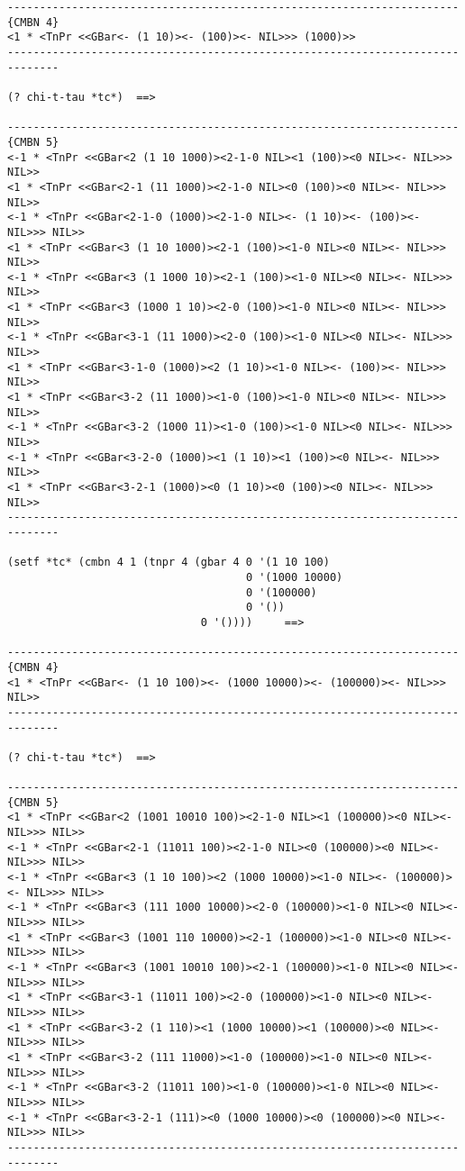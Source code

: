 {\footnotesize\begin{verbatim}
----------------------------------------------------------------------{CMBN 4}
<1 * <TnPr <<GBar<- (1 10)><- (100)><- NIL>>> (1000)>>
------------------------------------------------------------------------------

(? chi-t-tau *tc*)  ==>

----------------------------------------------------------------------{CMBN 5}
<-1 * <TnPr <<GBar<2 (1 10 1000)><2-1-0 NIL><1 (100)><0 NIL><- NIL>>> NIL>>
<1 * <TnPr <<GBar<2-1 (11 1000)><2-1-0 NIL><0 (100)><0 NIL><- NIL>>> NIL>>
<-1 * <TnPr <<GBar<2-1-0 (1000)><2-1-0 NIL><- (1 10)><- (100)><- NIL>>> NIL>>
<1 * <TnPr <<GBar<3 (1 10 1000)><2-1 (100)><1-0 NIL><0 NIL><- NIL>>> NIL>>
<-1 * <TnPr <<GBar<3 (1 1000 10)><2-1 (100)><1-0 NIL><0 NIL><- NIL>>> NIL>>
<1 * <TnPr <<GBar<3 (1000 1 10)><2-0 (100)><1-0 NIL><0 NIL><- NIL>>> NIL>>
<-1 * <TnPr <<GBar<3-1 (11 1000)><2-0 (100)><1-0 NIL><0 NIL><- NIL>>> NIL>>
<1 * <TnPr <<GBar<3-1-0 (1000)><2 (1 10)><1-0 NIL><- (100)><- NIL>>> NIL>>
<1 * <TnPr <<GBar<3-2 (11 1000)><1-0 (100)><1-0 NIL><0 NIL><- NIL>>> NIL>>
<-1 * <TnPr <<GBar<3-2 (1000 11)><1-0 (100)><1-0 NIL><0 NIL><- NIL>>> NIL>>
<-1 * <TnPr <<GBar<3-2-0 (1000)><1 (1 10)><1 (100)><0 NIL><- NIL>>> NIL>>
<1 * <TnPr <<GBar<3-2-1 (1000)><0 (1 10)><0 (100)><0 NIL><- NIL>>> NIL>>
------------------------------------------------------------------------------

(setf *tc* (cmbn 4 1 (tnpr 4 (gbar 4 0 '(1 10 100)
                                     0 '(1000 10000)
                                     0 '(100000)
                                     0 '())
                              0 '())))     ==>

----------------------------------------------------------------------{CMBN 4}
<1 * <TnPr <<GBar<- (1 10 100)><- (1000 10000)><- (100000)><- NIL>>> NIL>>
------------------------------------------------------------------------------

(? chi-t-tau *tc*)  ==>

----------------------------------------------------------------------{CMBN 5}
<1 * <TnPr <<GBar<2 (1001 10010 100)><2-1-0 NIL><1 (100000)><0 NIL><- NIL>>> NIL>>
<-1 * <TnPr <<GBar<2-1 (11011 100)><2-1-0 NIL><0 (100000)><0 NIL><- NIL>>> NIL>>
<-1 * <TnPr <<GBar<3 (1 10 100)><2 (1000 10000)><1-0 NIL><- (100000)><- NIL>>> NIL>>
<-1 * <TnPr <<GBar<3 (111 1000 10000)><2-0 (100000)><1-0 NIL><0 NIL><- NIL>>> NIL>>
<1 * <TnPr <<GBar<3 (1001 110 10000)><2-1 (100000)><1-0 NIL><0 NIL><- NIL>>> NIL>>
<-1 * <TnPr <<GBar<3 (1001 10010 100)><2-1 (100000)><1-0 NIL><0 NIL><- NIL>>> NIL>>
<1 * <TnPr <<GBar<3-1 (11011 100)><2-0 (100000)><1-0 NIL><0 NIL><- NIL>>> NIL>>
<1 * <TnPr <<GBar<3-2 (1 110)><1 (1000 10000)><1 (100000)><0 NIL><- NIL>>> NIL>>
<1 * <TnPr <<GBar<3-2 (111 11000)><1-0 (100000)><1-0 NIL><0 NIL><- NIL>>> NIL>>
<-1 * <TnPr <<GBar<3-2 (11011 100)><1-0 (100000)><1-0 NIL><0 NIL><- NIL>>> NIL>>
<-1 * <TnPr <<GBar<3-2-1 (111)><0 (1000 10000)><0 (100000)><0 NIL><- NIL>>> NIL>>
------------------------------------------------------------------------------
\end{verbatim}}
